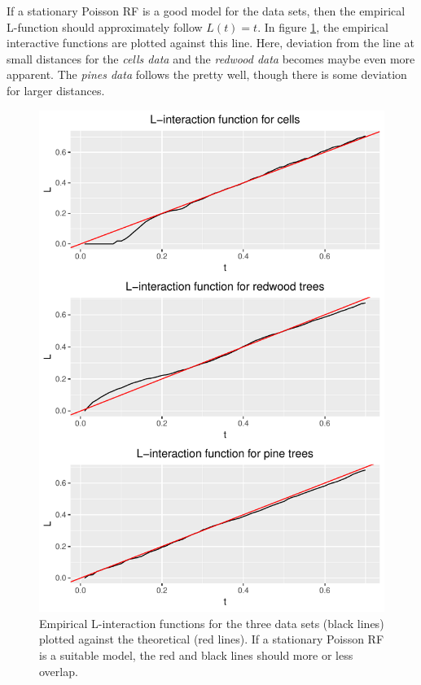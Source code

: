 If a stationary Poisson RF is a good model for the data sets, then the empirical L-function should approximately follow $L(t) = t$. In figure \ref{fig:L_emp_theor}, the empirical interactive functions are plotted against this line. Here, deviation from the line at small distances for the \textit{cells data} and the \textit{redwood data} becomes maybe even more apparent. The \textit{pines data} follows the pretty well, though there is some deviation for larger distances. 

\begin{figure}
    \centering
    \includegraphics[scale=0.95]{figures/prob1_L_emp_theor.pdf}
    \caption{Empirical L-interaction functions for the three data sets (black lines) plotted against the theoretical (red lines). If a stationary Poisson RF is a suitable model, the red and black lines should more or less overlap.}
    \label{fig:L_emp_theor}
\end{figure}

